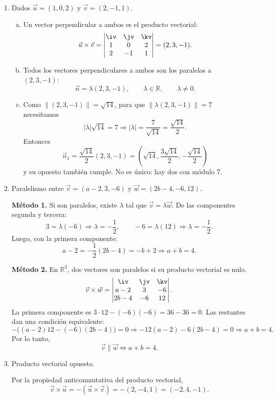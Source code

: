 \begin{enumerate}[\hspace{-3mm}$1)$]
\item Dados $\vec u=(1,0,2)$ y $\vec v=(2,-1,1)$.
\begin{sol}
\begin{enumerate}[a)]
\item Un vector perpendicular a ambos es el producto vectorial:
\[
\vec u\times\vec v=
\begin{vmatrix}
\iv&\jv&\kv\\
1&0&2\\
2&-1&1
\end{vmatrix}
=(2,3,-1).
\]
\item Todos los vectores perpendiculares a ambos son los paralelos a $(2,3,-1)$:
\[
\vec n=\lambda(2,3,-1),\qquad \lambda\in\mathbb R,\qquad \lambda\neq0.
\]
\item Como $\|(2,3,-1)\|=\sqrt{14}$, para que $\|\lambda(2,3,-1)\|=7$ necesitamos
\[
|\lambda|\sqrt{14}=7\Rightarrow |\lambda|=\frac7{\sqrt{14}}=\frac{\sqrt{14}}{2}.
\]
Entonces
\[
\vec n_1=\frac{\sqrt{14}}2(2,3,-1)=\left(\sqrt{14},\frac{3\sqrt{14}}2,-\frac{\sqrt{14}}2\right)
\]
y su opuesto también cumple. No es único: hay dos con módulo $7$.
\end{enumerate}
\end{sol}

\item Paralelismo entre $\vec v=(a-2,3,-6)$ y $\vec w=(2b-4,-6,12)$.
\begin{sol}
\textbf{Método 1.} Si son paralelos, existe $\lambda$ tal que $\vec v=\lambda\vec w$. De las componentes segunda y tercera:
\[
3=\lambda(-6)\Rightarrow \lambda=-\frac12,
\qquad
-6=\lambda(12)\Rightarrow \lambda=-\frac12.
\]
Luego, con la primera componente:
\[
a-2=-\frac12(2b-4)=-b+2
\Rightarrow a+b=4.
\]

\textbf{Método 2.} En $\mathbb R^3$, dos vectores son paralelos si su producto vectorial es nulo.
\[
\vec v\times\vec w=
\begin{vmatrix}
\iv&\jv&\kv\\
a-2&3&-6\\
2b-4&-6&12
\end{vmatrix}.
\]
La primera componente es $3\cdot12-(-6)(-6)=36-36=0$. Las restantes dan una condición equivalente:
\[
-\big((a-2)12-(-6)(2b-4)\big)=0
\Rightarrow -12(a-2)-6(2b-4)=0
\Rightarrow a+b=4.
\]
Por lo tanto,
\[
\boxed{\vec v\parallel\vec w \Longleftrightarrow a+b=4.}
\]
\end{sol}

\item Producto vectorial opuesto.
\begin{sol}
Por la propiedad anticonmutativa del producto vectorial,
\[
\vec v\times\vec u=-(\vec u\times\vec v)=-(2,-4,1)=(-2,4,-1).
\]
\end{sol}


\end{enumerate}
